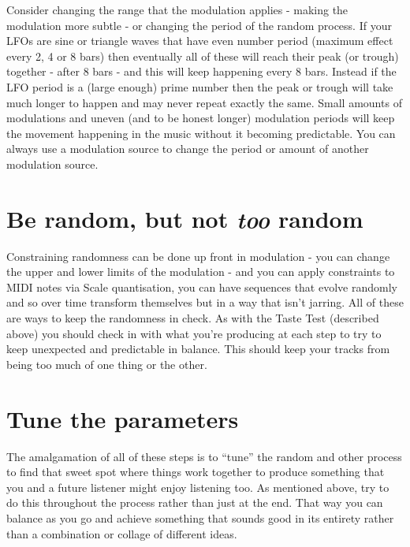 \documentclass[
  12pt,
  letterpaper,
  oneside,
  open=any]{scrbook}
\begin{document}
Consider changing the range that the modulation applies - making the
modulation more subtle - or changing the period of the random process.
If your LFOs are sine or triangle waves that have even number period
(maximum effect every 2, 4 or 8 bars) then eventually all of these will
reach their peak (or trough) together - after 8 bars - and this will
keep happening every 8 bars. Instead if the LFO period is a (large
enough) prime number then the peak or trough will take much longer to
happen and may never repeat exactly the same. Small amounts of
modulations and uneven (and to be honest longer) modulation periods will
keep the movement happening in the music without it becoming
predictable. You can always use a modulation source to change the period
or amount of another modulation source.

\section{\texorpdfstring{Be random, but not \textbf{\emph{too}}
random}{Be random, but not too random}}\label{be-random-but-not-too-random}

Constraining randomness can be done up front in modulation - you can
change the upper and lower limits of the modulation - and you can apply
constraints to MIDI notes via Scale quantisation, you can have sequences
that evolve randomly and so over time transform themselves but in a way
that isn't jarring. All of these are ways to keep the randomness in
check. As with the Taste Test (described above) you should check in with
what you're producing at each step to try to keep unexpected and
predictable in balance. This should keep your tracks from being too much
of one thing or the other.

\section{Tune the parameters}\label{tune-the-parameters}

The amalgamation of all of these steps is to ``tune'' the random and
other process to find that sweet spot where things work together to
produce something that you and a future listener might enjoy listening
too. As mentioned above, try to do this throughout the process rather
than just at the end. That way you can balance as you go and achieve
something that sounds good in its entirety rather than a combination or
collage of different ideas.

\end{document}
